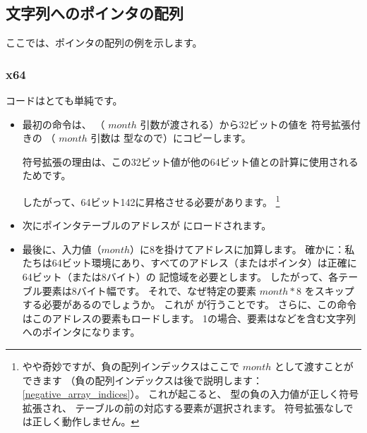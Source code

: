 ﻿\subsection{文字列へのポインタの配列}
\label{array_of_pointers_to_strings}

ここでは、ポインタの配列の例を示します。



\subsubsection{x64}



コードはとても単純です。

\begin{itemize}

\item
{}

最初の命令は、 \ECX （ $month$ 引数が渡される）から32ビットの値を
符号拡張付きの \RAX （ $month$ 引数は \Tint 型なので）にコピーします。

符号拡張の理由は、この32ビット値が他の64ビット値との計算に使用されるためです。

したがって、64ビット142に昇格させる必要があります。%
\footnote{やや奇妙ですが、負の配列インデックスはここで $month$ として渡すことができます
（負の配列インデックスは後で説明します：\ref{negative_array_indices}）。 %
これが起こると、 \Tint 型の負の入力値が正しく符号拡張され、
テーブルの前の対応する要素が選択されます。 符号拡張なしでは正しく動作しません。}

\item
次にポインタテーブルのアドレスが \RCX にロードされます。

\item
最後に、入力値（$month$）に8を掛けてアドレスに加算します。 
確かに：私たちは64ビット環境にあり、すべてのアドレス（またはポインタ）は正確に64ビット（または8バイト）の
記憶域を必要とします。 
したがって、各テーブル要素は8バイト幅です。 
それで、なぜ特定の要素 $month*8$ をスキップする必要があるのでしょうか。
これが \MOV が行うことです。 
さらに、この命令はこのアドレスの要素もロードします。 
1の場合、要素はなどを含む文字列へのポインタになります。

\end{itemize}

